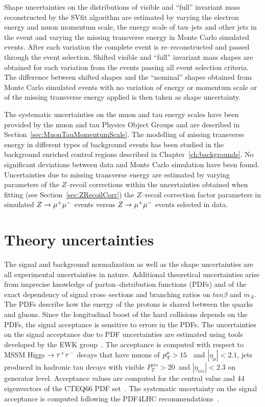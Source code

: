 Shape uncertainties on the distributions of visible and ``full'' invariant mass
reconstructed by the SVfit algorithm are estimated by varying the electron
energy and muon momentum scale, the energy scale of tau--jets and other jets in
the event and varying the missing transverse energy in Monte Carlo simulated
events.  After each variation the complete event is re--reconstructed and passed
through the event selection.  Shifted visible and ``full'' invariant mass shapes
are obtained for each variation from the events passing all event selection
criteria.  The difference between shifted shapes and the ``nominal'' shapes
obtained from Monte Carlo simulated events with no variation of energy or
momentum scale or of the missing transverse energy applied is then taken as
shape uncertainty.

The systematic uncertainties on the muon and tau energy scales have been
provided by the muon and tau Physics Object Groups and are described in
Section~\ref{sec:MuonTauMomentumScale}.  The modelling of missing transverse
energy in different types of background events has been studied in the
background enriched control regions described in Chapter~\ref{ch:backgrounds}.
No significant deviations between data and Monte Carlo simulation have been
found.  Uncertainties due to missing transverse energy are estimated by varying
parameters of the $Z$--recoil corrections within the uncertainties obtained when
fitting (see Section~\ref{sec:ZRecoilCorr}) the $Z$--recoil correction factor
parameters in simulated $Z \to \mu^+\mu^-$ events versus $Z \to \mu^+\mu^-$ events selected in
data.

\section{Theory uncertainties}

The signal and background normalization as well as the shape uncertainties are
all experimental uncertainties in nature.  Additional theoretical uncertainties
arise from imprecise knowledge of parton--distribution functions (PDFs) and of
the exact dependency of signal cross--sections and branching ratios on
$tan\beta$ and $m_A$.  The PDFs describe how the energy of the protons is shared
between the quarks and gluons.  Since the longitudinal boost of the hard
collisions depends on the PDFs, the signal acceptance is sensitive to errors in
the PDFs.  The uncertainties on the signal acceptance due to PDF uncertainties
are estimated using tools developed by the EWK
group~\cite{CMS_EWK_pdfUncertaintyTools}.  The acceptance is computed with
respect to MSSM Higgs $\to \tau^+\tau^-$ decays that have muons of $p_{\mathrm{T}}^{\mu} > 15$~\GeVc
and $\left| \eta_{\mu} \right| < 2.1$, jets produced in hadronic tau decays with
visible $P_{T}^{vis} > 20$~\GeV and $\left| \eta_{vis} \right| < 2.3$ on
generator level.  Acceptance values are computed for the central value and $44$
eigenvectors of the CTEQ66 PDF set~\cite{CTEQpdfSet}.  The systematic
uncertainty on the signal acceptance is computed following the PDF4LHC
recommendations~\cite{pdfAccSys01,pdfAccSys02}.

